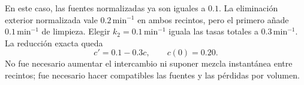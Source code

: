 En este caso, las fuentes normalizadas ya son iguales a \(0.1\). La eliminación exterior normalizada vale \(0.2\,\mathrm{min}^{-1}\) en ambos recintos, pero el primero añade \(0.1\,\mathrm{min}^{-1}\) de limpieza. Elegir \(k_2=0.1\,\mathrm{min}^{-1}\) iguala las tasas totales a \(0.3\,\mathrm{min}^{-1}\). La reducción exacta queda
\[
c'=0.1-0.3c,\qquad c(0)=0.20.
\]
No fue necesario aumentar el intercambio ni suponer mezcla instantánea entre recintos; fue necesario hacer compatibles las fuentes y las pérdidas por volumen.
